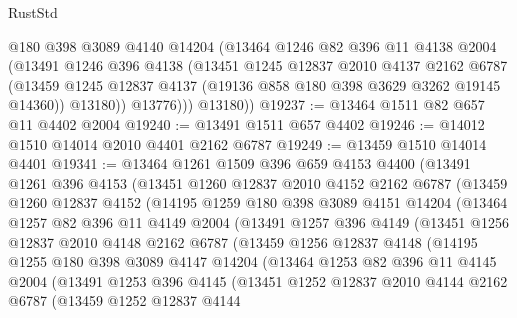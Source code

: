 \begin{lexlean}{RustStd}
\begin{coremodule}
{\begin{coremodule}
{{{{{{{{{{{{{{{{{{{{{{{{{{{{{{{            @180
            @398
            @3089
            @4140
            @14204
            (@13464
              @1246
              @82
              @396
              @11
              @4138
              @2004
              (@13491
                @1246
                @396
                @4138
                (@13451
                  @1245
                  @12837
                  @2010
                  @4137
                  @2162
                  @6787
                  (@13459 @1245 @12837 @4137 (@19136 @858 @180 @398 @3629 @3262 @19145 @14360))
                  @13180))
              @13776)))
        @13180))
@19237 := @13464 @1511 @82 @657 @11 @4402 @2004
@19240 := @13491 @1511 @657 @4402
@19246 := @14012 @1510 @14014 @2010 @4401 @2162 @6787
@19249 := @13459 @1510 @14014 @4401
@19341 := @13464
    @1261
    @1509
    @396
    @659
    @4153
    @4400
    (@13491
      @1261
      @396
      @4153
      (@13451
        @1260
        @12837
        @2010
        @4152
        @2162
        @6787
        (@13459
          @1260
          @12837
          @4152
          (@14195
            @1259
            @180
            @398
            @3089
            @4151
            @14204
            (@13464
              @1257
              @82
              @396
              @11
              @4149
              @2004
              (@13491
                @1257
                @396
                @4149
                (@13451
                  @1256
                  @12837
                  @2010
                  @4148
                  @2162
                  @6787
                  (@13459
                    @1256
                    @12837
                    @4148
                    (@14195
                      @1255
                      @180
                      @398
                      @3089
                      @4147
                      @14204
                      (@13464
                        @1253
                        @82
                        @396
                        @11
                        @4145
                        @2004
                        (@13491
                          @1253
                          @396
                          @4145
                          (@13451
                            @1252
                            @12837
                            @2010
                            @4144
                            @2162
                            @6787
                            (@13459
                              @1252
                              @12837
                              @4144
}}}}}}}}}}}}}}}}}}}}}}}}}}}}}}}
\end{coremodule}}
\end{coremodule}
\end{lexlean}
